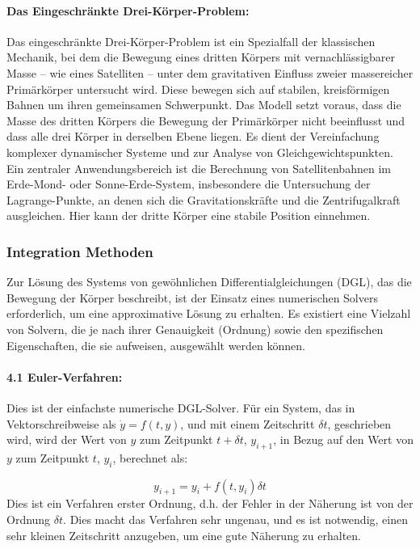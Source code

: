 \documentclass[a4paper,12pt,twoside]{article}
\begin{document}
\paragraph{Das Eingeschränkte Drei-Körper-Problem:}
Das eingeschränkte Drei-Körper-Problem ist ein Spezialfall der klassischen Mechanik, bei dem die Bewegung eines dritten Körpers mit vernachlässigbarer Masse – wie eines Satelliten – unter dem gravitativen Einfluss zweier massereicher Primärkörper untersucht wird. Diese bewegen sich auf stabilen, kreisförmigen Bahnen um ihren gemeinsamen Schwerpunkt.
Das Modell setzt voraus, dass die Masse des dritten Körpers die Bewegung der Primärkörper nicht beeinflusst und dass alle drei Körper in derselben Ebene liegen. Es dient der Vereinfachung komplexer dynamischer Systeme und zur Analyse von Gleichgewichtspunkten.
Ein zentraler Anwendungsbereich ist die Berechnung von Satellitenbahnen im Erde-Mond- oder Sonne-Erde-System, insbesondere die Untersuchung der Lagrange-Punkte, an denen sich die Gravitationskräfte und die Zentrifugalkraft ausgleichen. Hier kann der dritte Körper eine stabile Position einnehmen.


\subsubsection{Integration Methoden}
Zur Lösung des Systems von gewöhnlichen Differentialgleichungen (DGL), das die Bewegung der Körper beschreibt, ist der Einsatz eines numerischen Solvers erforderlich, um eine approximative Lösung zu erhalten. Es existiert eine Vielzahl von Solvern, die je nach ihrer Genauigkeit (Ordnung) sowie den spezifischen Eigenschaften, die sie aufweisen, ausgewählt werden können.

\paragraph{4.1 Euler-Verfahren: }
Dies ist der einfachste numerische DGL-Solver. Für ein System, das in Vektorschreibweise als $ \dot{y} = f(t, y) $, und mit einem Zeitschritt $\delta t$, geschrieben wird, wird der Wert von $y$ zum Zeitpunkt $t + \delta t$, $y_{i+1}$, in Bezug auf den Wert von $y$ zum Zeitpunkt $t$, $y_i$, berechnet als:

\begin{equation*}
    y_{i+1} = y_i + f(t, y_i)\delta t
\end{equation*}
Dies ist ein Verfahren erster Ordnung, d.h. der Fehler in der Näherung ist von der Ordnung $\delta t$. Dies macht das Verfahren sehr ungenau, und es ist notwendig, einen sehr kleinen Zeitschritt anzugeben, um eine gute Näherung zu erhalten.
\end{document}
